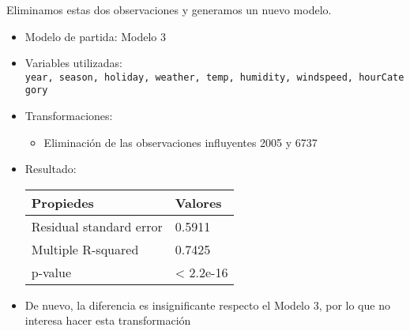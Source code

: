 \documentclass[
]{article}
\providecommand{\tightlist}{%
  \setlength{\itemsep}{0pt}\setlength{\parskip}{0pt}}
\begin{document}
Eliminamos estas dos observaciones y generamos un nuevo modelo.

\begin{itemize}
\item
  Modelo de partida: Modelo 3
\item
  Variables utilizadas:
  \texttt{year,\ season,\ holiday,\ weather,\ temp,\ humidity,\ windspeed,\ hourCategory}
\item
  Transformaciones:

  \begin{itemize}
  \tightlist
  \item
    Eliminación de las observaciones influyentes 2005 y 6737
  \end{itemize}
\item
  Resultado:

  \begin{longtable}[]{@{}ll@{}}
  \toprule
  Propiedes & Valores\tabularnewline
  \midrule
  \endhead
  Residual standard error & 0.5911\tabularnewline
  Multiple R-squared & 0.7425\tabularnewline
  p-value & \textless{} 2.2e-16\tabularnewline
  \bottomrule
  \end{longtable}
\item
  De nuevo, la diferencia es insignificante respecto el Modelo 3, por lo
  que no interesa hacer esta transformación
\end{itemize}
\end{document}
